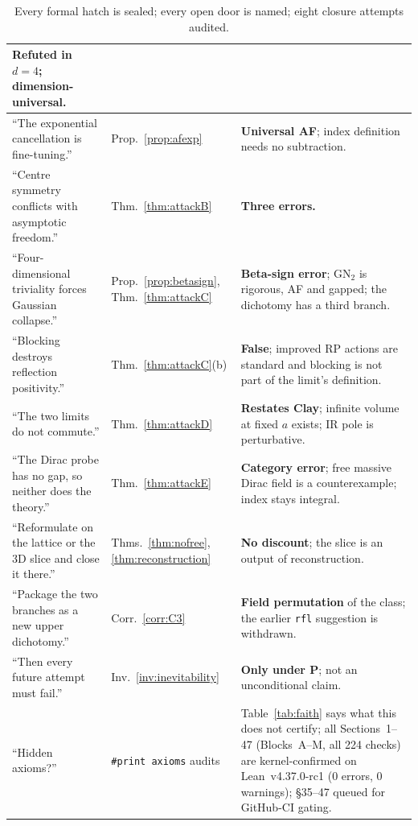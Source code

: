 \documentclass[11pt,a4paper]{article}
\theoremstyle{plain}
\theoremstyle{definition}
\theoremstyle{remark}
\renewcommand{\_}{\oldunderscore\allowbreak}
\begin{document}
\begin{table}[!htbp]
\begin{tabularx}{\textwidth}{p{4.2cm} p{4.3cm} X}
\textbf{Refuted in $d=4$}; dimension-universal.\\
\midrule
``The exponential cancellation is fine-tuning.'' & Prop.~\ref{prop:afexp} &
\textbf{Universal AF}; index definition needs no subtraction.\\
\midrule
``Centre symmetry conflicts with asymptotic freedom.'' & Thm.~\ref{thm:attackB} &
\textbf{Three errors.}\\
\midrule
``Four-dimensional triviality forces Gaussian collapse.'' & Prop.~\ref{prop:betasign},
Thm.~\ref{thm:attackC} & \textbf{Beta-sign error}; GN$_2$ is rigorous, AF and gapped; the
dichotomy has a third branch.\\
\midrule
``Blocking destroys reflection positivity.'' & Thm.~\ref{thm:attackC}(b) &
\textbf{False}; improved RP actions are standard and blocking is not part of the limit's
definition.\\
\midrule
``The two limits do not commute.'' & Thm.~\ref{thm:attackD} &
\textbf{Restates Clay}; infinite volume at fixed $a$ exists; IR pole is perturbative.\\
\midrule
``The Dirac probe has no gap, so neither does the theory.'' & Thm.~\ref{thm:attackE} &
\textbf{Category error}; free massive Dirac field is a counterexample; index stays integral.\\
\midrule
``Reformulate on the lattice or the 3D slice and close it there.'' &
Thms.~\ref{thm:nofree},\ref{thm:reconstruction} & \textbf{No discount}; the slice is an output of
reconstruction.\\
\midrule
``Package the two branches as a new upper dichotomy.'' & Corr.~\ref{corr:C3} &
\textbf{Field permutation} of the class; the earlier \texttt{rfl} suggestion is withdrawn.\\
\midrule
``Then every future attempt must fail.'' & Inv.~\ref{inv:inevitability} &
\textbf{Only under \textbf{P}}; not an unconditional claim.\\
\midrule
``Hidden axioms?'' & \texttt{\#print axioms} audits & Table~\ref{tab:faith} says what this does
not certify; all Sections~1--47 (Blocks~A--M, all 224 checks) are kernel-confirmed on Lean~v4.37.0-rc1 (0 errors, 0 warnings); \S35--47 queued for GitHub-CI gating.\\
\bottomrule
\end{tabularx}
\caption{Every formal hatch is sealed; every open door is named; eight closure attempts audited.}
\label{tab:closure}
\end{table}
\clearpage
\end{document}
